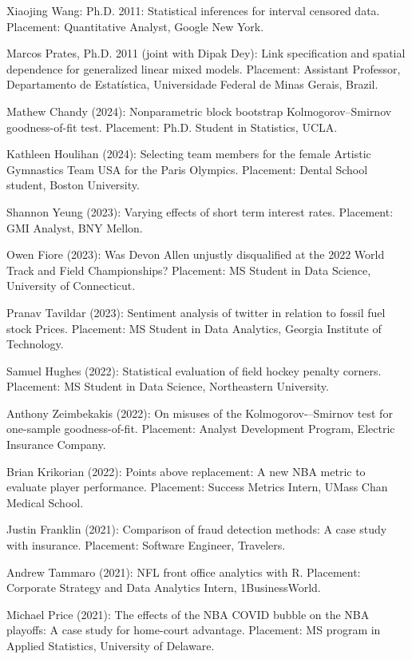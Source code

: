 \documentclass[Statistics]{vita}
\begin{document}
\begin{vita}
\begin{Students}
\begin{Ph.D.}
    \item Xiaojing Wang: Ph.D. 2011: Statistical inferences for interval censored data. Placement: Quantitative Analyst, Google New York.
    \item Marcos Prates, Ph.D. 2011 (joint with Dipak Dey): Link specification and spatial dependence for generalized linear mixed models. Placement: Assistant Professor, Departamento de Estat\'{i}stica, Universidade Federal de Minas Gerais, Brazil.
    \end{Ph.D.}
    \begin{UndergraduateHonor}
    \item Mathew Chandy (2024): Nonparametric block bootstrap Kolmogorov--Smirnov goodness-of-fit test. Placement: Ph.D. Student in Statistics, UCLA.
    \item Kathleen Houlihan (2024): Selecting team members for the female Artistic Gymnastics Team USA for the Paris Olympics. Placement: Dental School student, Boston University.
    \item Shannon Yeung (2023): Varying effects of short term interest rates. Placement: GMI Analyst, BNY Mellon.
    \item Owen Fiore (2023): Was Devon Allen unjustly disqualified at the 2022 World Track and Field Championships? Placement: MS Student in Data Science, University of Connecticut.
    \item Pranav Tavildar (2023): Sentiment analysis of twitter in relation to fossil fuel stock Prices. Placement: MS Student in Data Analytics, Georgia Institute of Technology.
    \item Samuel Hughes (2022): Statistical evaluation of field hockey penalty corners. Placement: MS Student in Data Science, Northeastern University.
    \item Anthony Zeimbekakis (2022): On misuses of the Kolmogorov-–Smirnov test for one-sample goodness-of-fit. Placement: Analyst Development Program, Electric Insurance Company.
    \item Brian Krikorian (2022): Points above replacement: A new NBA metric to evaluate player performance. Placement: Success Metrics Intern, UMass Chan Medical School.
    \item Justin Franklin (2021): Comparison of fraud detection methods: A case study with insurance. Placement: Software Engineer, Travelers.
    \item Andrew Tammaro (2021): NFL front office analytics with R. Placement: Corporate Strategy and Data Analytics Intern, 1BusinessWorld.
    \item Michael Price (2021): The effects of the NBA COVID bubble on the NBA playoffs: A case study for home-court advantage. Placement: MS program in Applied Statistics, University of Delaware.

\end{UndergraduateHonor}
\end{Students}
\end{vita}
\end{document}
